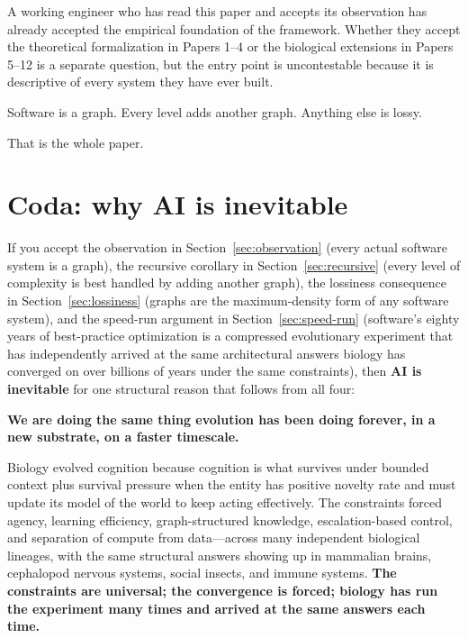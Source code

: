 \documentclass[11pt]{article}
\begin{document}
A working engineer who has read this paper and accepts its observation has already accepted the empirical foundation of the framework. Whether they accept the theoretical formalization in Papers 1--4 or the biological extensions in Papers 5--12 is a separate question, but the entry point is uncontestable because it is descriptive of every system they have ever built.

Software is a graph. Every level adds another graph. Anything else is lossy.

That is the whole paper.

\section*{Coda: why AI is inevitable}
\label{sec:coda}

If you accept the observation in Section~\ref{sec:observation} (every actual software system is a graph), the recursive corollary in Section~\ref{sec:recursive} (every level of complexity is best handled by adding another graph), the lossiness consequence in Section~\ref{sec:lossiness} (graphs are the maximum-density form of any software system), and the speed-run argument in Section~\ref{sec:speed-run} (software's eighty years of best-practice optimization is a compressed evolutionary experiment that has independently arrived at the same architectural answers biology has converged on over billions of years under the same constraints), then \textbf{AI is inevitable} for one structural reason that follows from all four:

\textbf{We are doing the same thing evolution has been doing forever, in a new substrate, on a faster timescale.}

Biology evolved cognition because cognition is what survives under bounded context plus survival pressure when the entity has positive novelty rate and must update its model of the world to keep acting effectively. The constraints forced agency, learning efficiency, graph-structured knowledge, escalation-based control, and separation of compute from data---across many independent biological lineages, with the same structural answers showing up in mammalian brains, cephalopod nervous systems, social insects, and immune systems. \textbf{The constraints are universal; the convergence is forced; biology has run the experiment many times and arrived at the same answers each time.}
\end{document}
